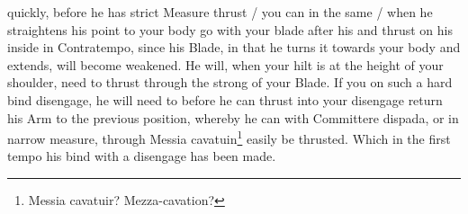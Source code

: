 \newpage


\newpage

quickly, before he has strict Measure thrust / you can in the same /
when he straightens his point to your body go with your blade after
his and thrust on his inside in Contratempo, since his Blade, in that
he turns it towards your body and extends, will become weakened. He
will, when your hilt is at the height of your shoulder, need to thrust
through the strong of your Blade. If you on such a hard bind disengage,
he will need to before he can thrust into your disengage return his Arm to
the previous position, whereby he can with Committere dispada, or in
narrow measure, through Messia cavatuin\footnote{Messia cavatuir? Mezza-cavation?}
easily be thrusted. Which in the first tempo his bind with a disengage has
been made.


